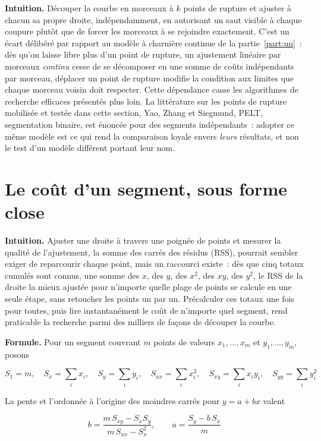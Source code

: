 \documentclass[11pt]{article}
\begin{document}
\textbf{Intuition.} Découper la courbe en morceaux à $k$ points de rupture
et ajuster à chacun sa propre droite, indépendamment, en autorisant un saut
visible à chaque coupure plutôt que de forcer les morceaux à se rejoindre
exactement. C'est un écart délibéré par rapport au modèle à charnière
continue de la partie~\ref{part:un}~: dès qu'on laisse libre plus d'un
point de rupture, un ajustement linéaire par morceaux \emph{continu} cesse
de se décomposer en une somme de coûts indépendants par morceau, déplacer
un point de rupture modifie la condition aux limites que chaque morceau
voisin doit respecter. Cette dépendance casse les algorithmes de
recherche efficaces présentés plus loin. La littérature sur les points de
rupture mobilisée et testée dans cette section, Yao, Zhang et Siegmund,
PELT, segmentation binaire, est énoncée pour des segments indépendants~:
adopter ce même modèle est ce qui rend la comparaison loyale envers
\emph{leurs} résultats, et non le test d'un modèle différent portant leur
nom.

\section{Le coût d'un segment, sous forme close}

\textbf{Intuition.} Ajuster une droite à travers une poignée de points et
mesurer la qualité de l'ajustement, la somme des carrés des résidus (RSS),
pourrait sembler exiger de reparcourir chaque point, mais un raccourci
existe~: dès que cinq totaux cumulés sont connus, une somme des $x$, des
$y$, des $x^2$, des $xy$, des $y^2$, le RSS de la droite la mieux ajustée
pour n'importe quelle plage de points se calcule en une seule étape, sans
retoucher les points un par un. Précalculer ces totaux une fois pour
toutes, puis lire instantanément le coût de n'importe quel segment, rend
praticable la recherche parmi des milliers de façons de découper la courbe.

\textbf{Formule.} Pour un segment couvrant $m$ points de valeurs $x_1,
\dots, x_m$ et $y_1, \dots, y_m$, posons

\begin{equation}
S_1 = m,\quad S_x = \sum_i x_i,\quad S_y = \sum_i y_i,\quad S_{xx} = \sum_i x_i^2,\quad S_{xy} = \sum_i x_i y_i,\quad S_{yy} = \sum_i y_i^2
\end{equation}

La pente et l'ordonnée à l'origine des moindres carrés pour $y = a + bx$
valent

\begin{equation}
b = \frac{m\,S_{xy} - S_x S_y}{m\,S_{xx} - S_x^2}, \qquad a = \frac{S_y - b\,S_x}{m}
\end{equation}
\end{document}
